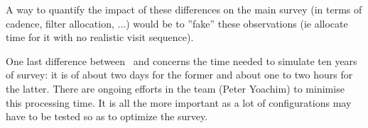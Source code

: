 A way to quantify the impact of these differences on the main survey (in terms of cadence, filter allocation, ...) would be to ''fake'' these observations (ie allocate time for it with no realistic visit sequence).

One last difference between \opsim~and \altsched concerns the time needed to simulate ten years of survey: it is of about two days for the former and about one to two hours for the latter. There are ongoing efforts in the \opsim team (Peter Yoachim) to minimise this processing time. It is all the more important as a lot of configurations may have to be tested so as to optimize the survey.  
